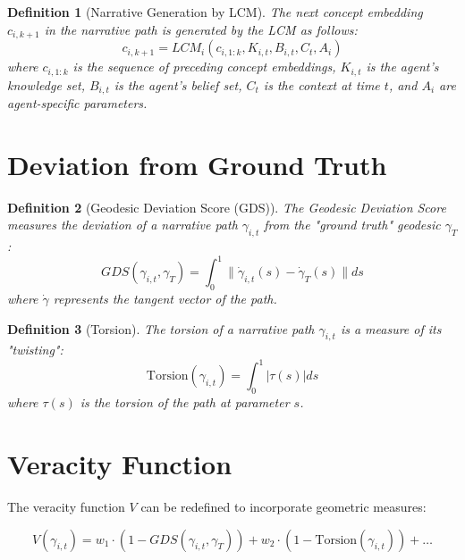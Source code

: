 \documentclass[12pt, a4paper]{article}
\newtheorem{definition}{Definition}
\begin{document}
\begin{definition}[Narrative Generation by LCM]
The next concept embedding \( c_{i,k+1} \) in the narrative path is generated by the LCM as follows:
\begin{equation}
    c_{i,k+1} = LCM_i(c_{i,1:k}, K_{i,t}, B_{i,t}, C_t, A_i)
\end{equation}
where \( c_{i,1:k} \) is the sequence of preceding concept embeddings, \( K_{i,t} \) is the agent's knowledge set, \( B_{i,t} \) is the agent's belief set, \( C_t \) is the context at time \( t \), and \( A_i \) are agent-specific parameters.
\end{definition}

\section{Deviation from Ground Truth}

\begin{definition}[Geodesic Deviation Score (GDS)]
The Geodesic Deviation Score measures the deviation of a narrative path \( \gamma_{i,t} \) from the "ground truth" geodesic \( \gamma_T \):
\begin{equation}
    GDS(\gamma_{i,t}, \gamma_T) = \int_0^1 \| \dot{\gamma}_{i,t}(s) - \dot{\gamma}_T(s) \| ds
\end{equation}
where \( \dot{\gamma} \) represents the tangent vector of the path.
\end{definition}

\begin{definition}[Torsion]
The torsion of a narrative path \( \gamma_{i,t} \) is a measure of its "twisting":
\begin{equation}
    \text{Torsion}(\gamma_{i,t}) = \int_0^1 | \tau(s) | ds
\end{equation}
where \( \tau(s) \) is the torsion of the path at parameter \( s \).
\end{definition}

\section{Veracity Function}

The veracity function \( V \) can be redefined to incorporate geometric measures:

\begin{equation}
V(\gamma_{i,t}) = w_1 \cdot (1 - GDS(\gamma_{i,t}, \gamma_T)) + w_2 \cdot (1 - \text{Torsion}(\gamma_{i,t})) + \dots
\end{equation}
\end{document}
